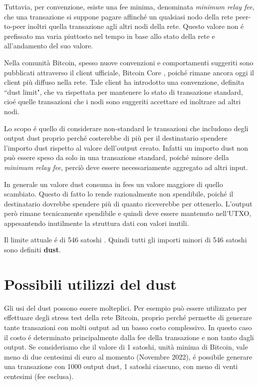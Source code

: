 Tuttavia, per convenzione, esiste una fee minima, denominata \textit{minimum relay fee}, che una transazione si suppone pagare affinché un qualsiasi nodo della rete peer-to-peer inoltri quella transazione agli altri nodi della rete. Questo valore non é prefissato ma varia piuttosto nel tempo in base allo stato della rete e all'andamento del suo valore. 

Nella comunità Bitcoin, spesso nuove convenzioni e comportamenti suggeriti sono pubblicati attraverso il client ufficiale, Bitcoin Core \cite{btccore}, poiché rimane ancora oggi il client più diffuso nella rete.  Tale client ha introdotto una convenzione, definita ``dust limit", che va rispettata per mantenere lo stato di transazione standard, cioé quelle transazioni che i nodi sono suggeriti accettare ed inoltrare ad altri nodi.

Lo scopo é quello di considerare non-standard le transazioni che includono degli output dust proprio perché costerebbe di più per il destinatario spendere l'importo dust rispetto al valore dell'output creato. Infatti un importo dust non può essere speso da solo in una transazione standard, poiché minore della \textit{minimum relay fee}, perciò deve essere necessariamente aggregato ad altri input.

In generale un valore dust consuma in fees un valore maggiore di quello scambiato. Questo di fatto lo rende razionalmente non spendibile, poiché il destinatario dovrebbe spendere più di quanto riceverebbe per ottenerlo. L'output però rimane tecnicamente spendibile e quindi deve essere mantenuto nell'UTXO, appesantendo inutilmente la struttura dati con valori inutili.

Il limite attuale é di 546 satoshi \cite{BtcDev}. Quindi tutti gli importi minori di 546 satoshi sono definiti \textbf{dust}.

\section{Possibili utilizzi del dust}

Gli usi del dust possono essere molteplici. Per esempio può essere utilizzato per effettuare degli stress test della rete Bitcoin, proprio perché permette di generare tante transazioni con molti output ad un basso costo complessivo. In questo caso il costo é determinato principalmente dalla fee della transazione e non tanto dagli output. Se consideriamo che il valore di 1 satoshi, unità minima di Bitcoin, vale meno di due centesimi di euro al momento (Novembre 2022), é possibile generare una transazione con 1000 output dust, 1 satoshi ciascuno, con meno di venti centesimi (fee esclusa).


